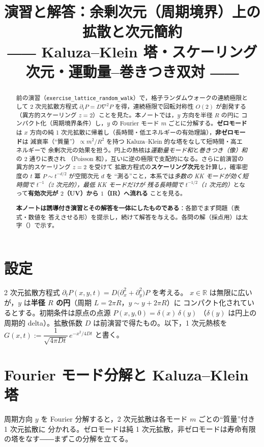 \documentclass[dvipdfmx, uplatex]{jsarticle}
\title{演習と解答：余剰次元（周期境界）上の拡散と次元簡約\\
\large ―― Kaluza--Klein 塔・スケーリング次元・運動量--巻きつき双対 ――}
\author{}
\date{}
\theoremstyle{definition}
\begin{document}
\maketitle
\vspace{-6zh}

\begin{abstract}
前の演習（\texttt{exercise\_lattice\_random\_walk}）で，格子ランダムウォークの連続極限として
2 次元拡散方程式 $\partial_t P=D\nabla^2P$ を得，連続極限で回転対称性 $O(2)$ が創発する
（異方的スケーリング $z=2$）ことを見た。本ノートでは，$y$ 方向を半径 $R$ の円に
コンパクト化（周期境界条件）し，$y$ の Fourier モード $m$ ごとに分解する。\textbf{ゼロモード}は
$x$ 方向の純 1 次元拡散に帰着し（長時間・低エネルギーの有効理論），\textbf{非ゼロモード}は
減衰率（``質量''）$\propto m^2/R^2$ を持つ Kaluza--Klein 的な塔をなして短時間・高エネルギーで
余剰次元の効果を担う。円上の熱核は\emph{運動量モード和}と\emph{巻きつき（像）和}の 2 通りに表され
（Poisson 和），互いに逆の極限で支配的になる。さらに前演習の異方的スケーリング $z=2$ を受けて
拡散方程式の\textbf{スケーリング次元}を計算し，確率密度の $t$ 冪 $P\sim t^{-d/2}$ が空間次元 $d$ を
``測る''こと，本系では\emph{多数の KK モードが効く短時間で $t^{-1}$（2 次元的），最低 KK モードだけが
残る長時間で $t^{-1/2}$（1 次元的）}となって\textbf{有効次元が $2$（UV）から $1$（IR）へ流れる}
ことを見る。

\textbf{本ノートは誘導付き演習とその解答を一体にしたものである}：各節でまず問題（表式・数値を
答えさせる形）を提示し，続けて解答を与える。各問の解（採点用）は太字（\boxed）で示す。
\end{abstract}

\tableofcontents

\section{設定}
2 次元拡散方程式 $\partial_t P(x,y,t)=D\bigl(\partial_x^2+\partial_y^2\bigr)P$ を考える。
$x\in\mathbb{R}$ は無限に広いが，$y$ は\textbf{半径 $R$ の円}（周期 $L=2\pi R$，$y\sim y+2\pi R$）に
コンパクト化されているとする。初期条件は原点の点源 $P(x,y,0)=\delta(x)\,\delta(y)$
（$\delta(y)$ は円上の周期的 delta）。拡散係数 $D$ は前演習で得たもの。以下，1 次元熱核を
$G(x,t):=\dfrac{1}{\sqrt{4\pi Dt}}\,e^{-x^2/4Dt}$ と書く。

\section{Fourier モード分解と Kaluza--Klein 塔}
周期方向 $y$ を Fourier 分解すると，2 次元拡散は各モード $m$ ごとの``質量''付き 1 次元拡散に
分かれる。ゼロモードは純 1 次元拡散，非ゼロモードは寿命有限の塔をなす――まずこの分解を立てる。
\end{document}
